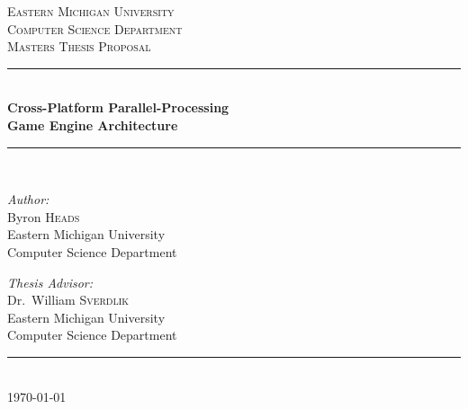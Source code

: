 \documentclass[12pt,a4paper,oneside]{article}
\newcommand{\HRule}{\rule{\linewidth}{0.5mm}}
\begin{document}
\begin{titlepage}
    \begin{center}
        \textsc{\large Eastern Michigan University}\\[1.5cm]
        \textsc{\large Computer Science Department}\\
        \textsc{\large Masters Thesis Proposal}\\[0.5cm]
        \HRule\\[0.4cm]
        { \huge \bfseries  Cross-Platform Parallel-Processing \\
            Game Engine Architecture }\\[0.4cm]
        \HRule\\[1.5cm]

        \begin{minipage}{0.45\textwidth}
            \begin{flushleft} \large
                \emph{Author:}\\
                Byron \textsc{Heads} \\
                \small Eastern Michigan University\\
                \small Computer Science Department \\
            \end{flushleft}
        \end{minipage}
        \begin{minipage}{0.45\textwidth}
            \begin{flushright} \large
                \emph{Thesis Advisor:} \\
                Dr.~William \textsc{Sverdlik}\\
                \small Eastern Michigan University\\
                \small Computer Science Department
            \end{flushright}
        \end{minipage}

        \vfill
    
        \HRule\\[0.5cm]
        { \large \today }
    \end{center}
\end{titlepage}
\end{document}
